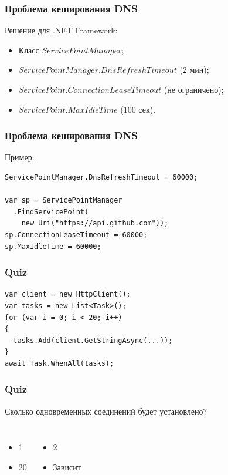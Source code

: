 \documentclass[17pt,aspectratio=169]{beamer}
\begin{document}
\begin{frame}
\frametitle{Проблема кеширования DNS}
Решение для .NET Framework:
\begin{itemize}
	\item <1-> Класс $ServicePointManager$;
	\item <2-> $ServicePointManager.DnsRefreshTimeout$ (2 мин);
	\item <3-> $ServicePoint.ConnectionLeaseTimeout$ (не ограничено);
	\item <4-> $ServicePoint.MaxIdleTime$ (100 сек).
\end{itemize}
\end{frame}

\begin{frame}[fragile]
\frametitle{Проблема кеширования DNS}
Пример:
\begin{lstlisting}
ServicePointManager.DnsRefreshTimeout = 60000;

var sp = ServicePointManager
  .FindServicePoint(
    new Uri("https://api.github.com"));
sp.ConnectionLeaseTimeout = 60000;
sp.MaxIdleTime = 60000;
\end{lstlisting}
\end{frame}

\begin{frame}[fragile]
\frametitle{Quiz}
\begin{lstlisting}
var client = new HttpClient();
var tasks = new List<Task>();
for (var i = 0; i < 20; i++)
{
  tasks.Add(client.GetStringAsync(...));
}
await Task.WhenAll(tasks);
\end{lstlisting}
\end{frame}

\begin{frame}
\frametitle{Quiz}
Сколько одновременных соединений будет установлено?
\newline
\begin{columns}
\begin{itemize}
\item <1> 1
\item <1> 20
\end{itemize}
\begin{itemize}
\item <1,2> 2
\item <1> Зависит
\end{itemize}
\end{columns}
\end{frame}
\end{document}
